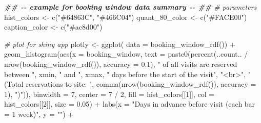 \documentclass[
  11 pt,
  openany]{book}
\newenvironment{Shaded}{\begin{snugshade}}{\end{snugshade}}
\newcommand{\AttributeTok}[1]{\textcolor[rgb]{0.77,0.63,0.00}{#1}}
\newcommand{\CommentTok}[1]{\textcolor[rgb]{0.56,0.35,0.01}{\textit{#1}}}
\newcommand{\DecValTok}[1]{\textcolor[rgb]{0.00,0.00,0.81}{#1}}
\newcommand{\DocumentationTok}[1]{\textcolor[rgb]{0.56,0.35,0.01}{\textbf{\textit{#1}}}}
\newcommand{\FloatTok}[1]{\textcolor[rgb]{0.00,0.00,0.81}{#1}}
\newcommand{\FunctionTok}[1]{\textcolor[rgb]{0.00,0.00,0.00}{#1}}
\newcommand{\NormalTok}[1]{#1}
\newcommand{\OtherTok}[1]{\textcolor[rgb]{0.56,0.35,0.01}{#1}}
\newcommand{\SpecialCharTok}[1]{\textcolor[rgb]{0.00,0.00,0.00}{#1}}
\newcommand{\StringTok}[1]{\textcolor[rgb]{0.31,0.60,0.02}{#1}}
\begin{document}
\begin{Shaded}
\begin{Highlighting}[]
\DocumentationTok{\#\# {-}{-} example for booking window data summary {-}{-} \#\#}
\CommentTok{\# parameters}
\NormalTok{hist\_colors }\OtherTok{\textless{}{-}} \FunctionTok{c}\NormalTok{(}\StringTok{"\#64863C"}\NormalTok{, }\StringTok{"\#466C04"}\NormalTok{)}
\NormalTok{quant\_80\_color }\OtherTok{\textless{}{-}} \FunctionTok{c}\NormalTok{(}\StringTok{"\#FACE00"}\NormalTok{)}
\NormalTok{caption\_color }\OtherTok{\textless{}{-}} \FunctionTok{c}\NormalTok{(}\StringTok{"\#ac8d00"}\NormalTok{)}

\CommentTok{\# plot for shiny app}
\NormalTok{plotly }\OtherTok{\textless{}{-}} \FunctionTok{ggplot}\NormalTok{(}
  \AttributeTok{data =} \FunctionTok{booking\_window\_rdf}\NormalTok{()) }\SpecialCharTok{+}
  \FunctionTok{geom\_histogram}\NormalTok{(}\FunctionTok{aes}\NormalTok{(}\AttributeTok{x =}\NormalTok{ booking\_window,}
                     \AttributeTok{text =} \FunctionTok{paste0}\NormalTok{(}\FunctionTok{percent}\NormalTok{(..count.. }\SpecialCharTok{/} \FunctionTok{nrow}\NormalTok{(}\FunctionTok{booking\_window\_rdf}\NormalTok{()), }
                                           \AttributeTok{accuracy =} \FloatTok{0.1}\NormalTok{), }
                                   \StringTok{" of all visits are reserved between "}\NormalTok{, xmin, }
                                   \StringTok{" and "}\NormalTok{, xmax, }
                                   \StringTok{" days before the start of the visit"}\NormalTok{, }
                                   \StringTok{"\textless{}br\textgreater{}"}\NormalTok{,}
                                   \StringTok{"(Total reservations to site: "}\NormalTok{,}
                                   \FunctionTok{comma}\NormalTok{(}\FunctionTok{nrow}\NormalTok{(}\FunctionTok{booking\_window\_rdf}\NormalTok{()), }\AttributeTok{accuracy =} \DecValTok{1}\NormalTok{), }
                                   \StringTok{")"}\NormalTok{)),}
                 \AttributeTok{binwidth =} \DecValTok{7}\NormalTok{,}
                 \AttributeTok{center =} \DecValTok{7} \SpecialCharTok{/} \DecValTok{2}\NormalTok{,}
                 \AttributeTok{fill =}\NormalTok{ hist\_colors[[}\DecValTok{1}\NormalTok{]], }
                 \AttributeTok{col =}\NormalTok{ hist\_colors[[}\DecValTok{2}\NormalTok{]], }\AttributeTok{size =} \FloatTok{0.05}\NormalTok{) }\SpecialCharTok{+}
  \FunctionTok{labs}\NormalTok{(}\AttributeTok{x =} \StringTok{"Days in advance before visit (each bar = 1 week)"}\NormalTok{,}
       \AttributeTok{y =} \StringTok{""}\NormalTok{) }\SpecialCharTok{+}

\end{Highlighting}
\end{Shaded}
\end{document}
